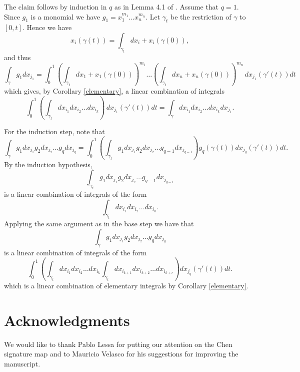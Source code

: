 \documentclass{amsart}
\begin{document}
The claim follows by induction in $q$ as in Lemma 4.1 of \cite{Chen2}. Assume that $q=1$. Since $g_1$ is a monomial we have $g_1=x_1^{m_1}\ldots x_n^{m_n}$. Let $\gamma_t$ be the restriction of $\gamma$ to $[0, t]$. Hence we have 
\[x_i(\gamma(t))=\int_{\gamma_t}dx_i+ x_i(\gamma(0)),  \]
and thus  
\[  \int_{\gamma}  g_1 dx_{j_1}=\int^1_0   \left(\int_{\gamma_t}dx_1+ x_1(\gamma(0))\right)^{m_1}\ldots   \left(\int_{\gamma_t}dx_n+ x_n(\gamma(0))\right)^{m_n}\, dx_{j_1}(\gamma'(t)) dt \]
which gives, by Corollary \ref{elementary}, a linear combination of integrals 
\[ \int_0^{1}   \left(\int_{\gamma_t}dx_{i_1}dx_{i_2} \ldots dx_{i_k}\right)\,  dx_{j_1}(\gamma'(t)) dt= \int_{\gamma}dx_{i_1}dx_{i_2} \ldots dx_{i_k} dx_{j_1}.   \]

For the induction step, note that
\[  \int_{\gamma}  g_{1}dx_{j_1}  g_2 dx_{j_2} \ldots  g_q dx_{j_q} =\int_0^1 \left( \int_{\gamma_t}  g_{1}dx_{j_1}  g_2 dx_{j_2} \ldots  g_{q-1} dx_{j_{q-1}} \right) g_q(\gamma(t))dx_{j_q}(\gamma'(t))dt.\]
By the induction hypothesis,
\[\int_{\gamma_t}  g_{1}dx_{j_1}  g_2 dx_{j_2} \ldots  g_{q-1} dx_{j_{q-1}}\]
is a linear combination of integrals of the form
\[ \int_{\gamma_t}dx_{i_1}dx_{i_2} \ldots dx_{i_k}.  \]
Applying the same argument as in the base step we have that 
\[  \int_{\gamma}  g_{1}dx_{j_1}  g_2 dx_{j_2} \ldots  g_q dx_{j_q}\]
is a linear combination of integrals of the form
\[ \int_0^1 \left( \int_{\gamma_t}dx_{i_1}dx_{i_2} \ldots dx_{i_k} \int_{\gamma_t} dx_{i_{k+1}}dx_{i_{k+2}} \ldots dx_{i_{k+r}}\right)dx_{j_q}(\gamma'(t))dt. \]
which is a linear combination of elementary integrals by Corollary \ref{elementary}. 




\section*{Acknowledgments}
We would like to thank Pablo Lessa for putting our attention on the Chen signature map and to Mauricio Velasco for his suggestions for improving the manuscript.
\end{document}
